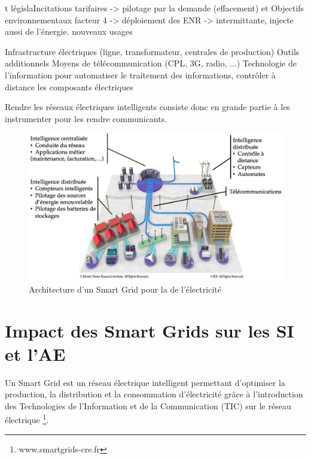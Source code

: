 t législaIncitations tarifaires -> pilotage par la demande (effacement)  et
Objectifs environnementaux facteur 4 -> déploiement des ENR -> intermittante, injecte aussi de l'énergie.
nouveaux usages


Infrastructure électriques (ligne, transformateur, centrales de production)
Outils additionnels
Moyens de télécommunication (CPL, 3G, radio, ...)
Technologie de l'information pour automatiser le traitement des informations, contrôler à distance les composants électriques 

Rendre les réseaux électriques intelligents consiste donc en grande partie à les instrumenter pour les rendre communicants.

\begin{figure}[!htbp]
 \begin{center}
  \includegraphics[width=1\textwidth]{images/problematique/archiSmartgrids.png}
 \end{center}
 \caption{Architecture d'un Smart Grid pour la  de l'électricité \protect\cite{favre2006ingenierie}}
 \label{fig:archismartgrids}
\end{figure}







\section{Impact des Smart Grids sur les SI et l'AE}

Un Smart Grid est un réseau électrique intelligent permettant d'optimiser la production, la distribution et la consommation d'électricité grâce à l'introduction des Technologies de l'Information et de la Communication (TIC) sur le réseau électrique \footnote{www.smartgrids-cre.fr}.

